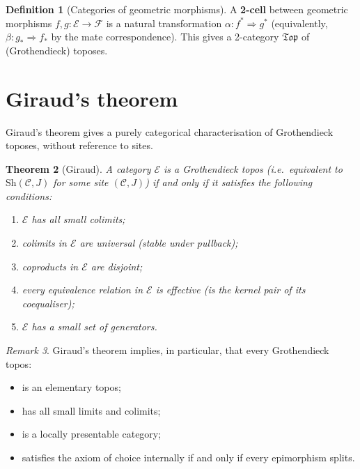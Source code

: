 \documentclass[a4paper,12pt]{book}
\theoremstyle{definition}
\newtheorem{definition}{Definition}[section]
\theoremstyle{plain}
\newtheorem{theorem}[definition]{Theorem}
\theoremstyle{remark}
\newtheorem{remark}[definition]{Remark}
\begin{document}
\begin{definition}[Categories of geometric morphisms]\label{def:geom-morph-cats}
A \textbf{2-cell} between geometric morphisms $f,g\colon\mathcal{E}\to\mathcal{F}$
is a natural transformation $\alpha\colon f^*\Rightarrow g^*$ (equivalently,
$\beta\colon g_*\Rightarrow f_*$ by the mate correspondence).  This gives
a 2-category $\mathfrak{Top}$ of (Grothendieck) toposes.
\end{definition}



\section{Giraud's theorem}\label{sec:giraud}


Giraud's theorem gives a purely categorical characterisation of
Grothendieck toposes, without reference to sites.

\begin{theorem}[Giraud]\label{thm:giraud}
A category $\mathcal{E}$ is a Grothendieck topos (i.e.\ equivalent to
$\mathrm{Sh}(\mathcal{C},J)$ for some site $(\mathcal{C},J)$)
if and only if it satisfies the following conditions:
\begin{enumerate}[label=(\roman*)]
\item $\mathcal{E}$ has all small colimits;
\item colimits in $\mathcal{E}$ are universal (stable under pullback);
\item coproducts in $\mathcal{E}$ are disjoint;
\item every equivalence relation in $\mathcal{E}$ is effective
      (is the kernel pair of its coequaliser);
\item $\mathcal{E}$ has a small set of generators.
\end{enumerate}
\end{theorem}

\begin{remark}\label{rem:giraud-consequences}
Giraud's theorem implies, in particular, that every Grothendieck topos:
\begin{itemize}
\item is an elementary topos;
\item has all small limits and colimits;
\item is a locally presentable category;
\item satisfies the axiom of choice internally if and only if every
      epimorphism splits.
\end{itemize}
\end{remark}
\end{document}
